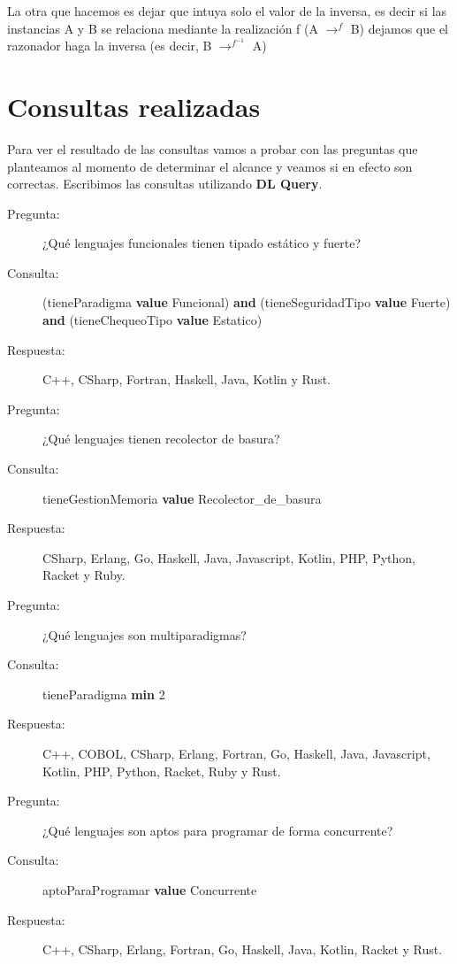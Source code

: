 \documentclass[12pt, titlepage, a4paper]{article}
\newcommand{\high}[2]{{\color{#1} \textbf{#2}}}
\begin{document}
La otra que hacemos es dejar que intuya solo el valor de la inversa, 
es decir si las instancias A y B se relaciona mediante la realización 
f (A $\rightarrow^f$ B) dejamos que el razonador haga la inversa 
(es decir, B $\rightarrow^{f^{-1}}$ A)


\section{Consultas realizadas}
Para ver el resultado de las consultas vamos a probar con las 
preguntas que planteamos al momento de determinar el alcance y 
veamos si en efecto son correctas. Escribimos las consultas utilizando
\textbf{DL Query}.

\begin{description}
    \item[Pregunta:] ¿Qué lenguajes funcionales tienen tipado estático y fuerte?
    \item[Consulta:] (tieneParadigma \high{magenta}{value} Funcional) \high{cyan}{and} 
    (tieneSeguridadTipo \high{magenta}{value} Fuerte) \high{cyan}{and} 
    (tieneChequeoTipo \high{magenta}{value} Estatico)
    \item[Respuesta:] C++, CSharp, Fortran, Haskell, Java, Kotlin y Rust.\\
    
    \item[Pregunta:] ¿Qué lenguajes tienen recolector de basura?
    \item[Consulta:] tieneGestionMemoria \high{magenta}{value} Recolector\_de\_basura
    \item[Respuesta:] CSharp, Erlang, Go, Haskell, Java, Javascript, Kotlin, PHP, Python, Racket y Ruby.\\
    
    \item[Pregunta:] ¿Qué lenguajes son multiparadigmas?
    \item[Consulta:] tieneParadigma \high{magenta}{min} 2
    \item[Respuesta:] C++, COBOL, CSharp, Erlang, Fortran, Go, Haskell, Java, Javascript, Kotlin, PHP, Python, Racket, Ruby y Rust.\\
    
    \item[Pregunta:] ¿Qué lenguajes son aptos para programar de forma concurrente?
    \item[Consulta:] aptoParaProgramar \high{magenta}{value} Concurrente
    \item[Respuesta:] C++, CSharp, Erlang, Fortran, Go, Haskell, Java, Kotlin, Racket y Rust.\\
\end{description}
\end{document}
